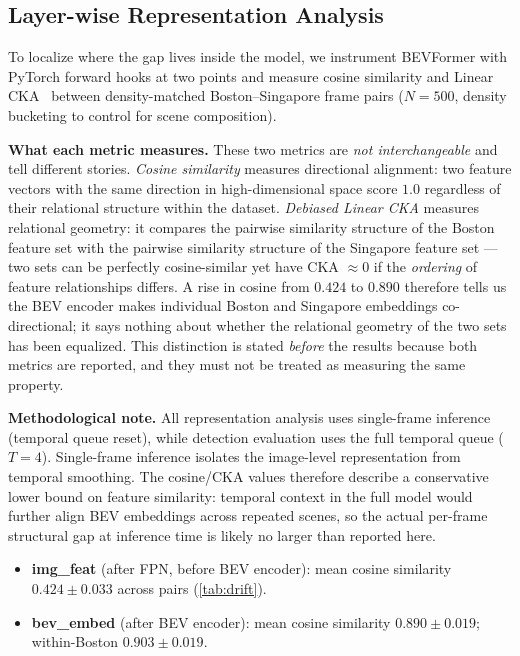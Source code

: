 \documentclass[letterpaper, 10pt, journal]{IEEEtran}
\begin{document}
\subsection{Layer-wise Representation Analysis}
\label{sec:repr}

To localize where the gap lives inside the model, we instrument BEVFormer with
PyTorch forward hooks at two points and measure cosine similarity and
Linear CKA~\cite{kornblith2019cka} between density-matched Boston--Singapore frame
pairs ($N=500$, density bucketing to control for scene composition).

\textbf{What each metric measures.}
These two metrics are \emph{not interchangeable} and tell different stories.
\emph{Cosine similarity} measures directional alignment: two feature vectors
with the same direction in high-dimensional space score $1.0$ regardless of their
relational structure within the dataset.
\emph{Debiased Linear CKA} measures relational geometry: it compares the
pairwise similarity structure of the Boston feature set with the pairwise similarity
structure of the Singapore feature set --- two sets can be perfectly cosine-similar
yet have CKA $\approx 0$ if the \emph{ordering} of feature relationships differs.
A rise in cosine from $0.424$ to $0.890$ therefore tells us the BEV encoder makes
individual Boston and Singapore embeddings co-directional; it says nothing about
whether the relational geometry of the two sets has been equalized.
This distinction is stated \emph{before} the results because both metrics are
reported, and they must not be treated as measuring the same property.

\textbf{Methodological note.}
All representation analysis uses single-frame inference (temporal queue reset), while
detection evaluation uses the full temporal queue ($T{=}4$).
Single-frame inference isolates the image-level representation from temporal smoothing.
The cosine/CKA values therefore describe a conservative lower bound on feature
similarity: temporal context in the full model would further align BEV embeddings
across repeated scenes, so the actual per-frame structural gap at inference time is
likely no larger than reported here.

\begin{itemize}
  \item \textbf{img\_feat} (after FPN, before BEV encoder): mean cosine similarity
        $\mathbf{0.424 \pm 0.033}$ across pairs (\cref{tab:drift}).
  \item \textbf{bev\_embed} (after BEV encoder): mean cosine similarity
        $\mathbf{0.890 \pm 0.019}$; within-Boston $0.903 \pm 0.019$.
\end{itemize}
\end{document}
